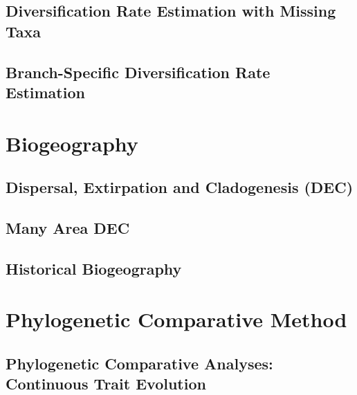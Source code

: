 \documentclass[11pt]{book}
\begin{document}
\chapter{Diversification Rate Estimation with Missing Taxa}
\def \ResourcePath {RB_DiversificationRate_Sampling_Tutorial/}


\chapter{Branch-Specific Diversification Rate Estimation}
\def \ResourcePath {RB_DiversificationRate_BranchSpecific_Tutorial/}




\part{Biogeography}

\chapter{Dispersal, Extirpation and Cladogenesis (DEC)}
\def \ResourcePath {RB_Biogeography_DEC_Tutorial/}


\chapter{Many Area DEC}
\def \ResourcePath {RB_Biogeography_many_area_Tutorial/}


\chapter{Historical Biogeography}
\def \ResourcePath {RB_Biogeography_Tutorial/}








\part{Phylogenetic Comparative Method}
\chapter{Phylogenetic Comparative Analyses: Continuous Trait Evolution}
\def \ResourcePath {RB_PhyloComparative_Tutorial/}

\end{document}
